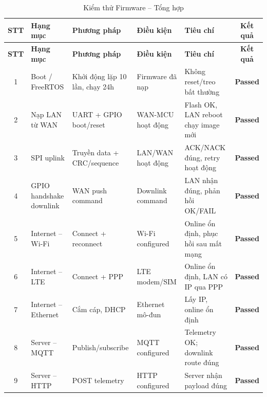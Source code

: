         \begin{longtable}{|c|p{}|p{}|p{}|p{}|c|}
            \caption{Kiểm thử Firmware -- Tổng hợp}
            \label{tab:test_firmware_summary} \\
            \hline
            \textbf{STT} & \textbf{Hạng mục} & \textbf{Phương pháp} & \textbf{Điều kiện} & \textbf{Tiêu chí} & \textbf{Kết quả} \\ \hline
            \endfirsthead
            \hline
            \textbf{STT} & \textbf{Hạng mục} & \textbf{Phương pháp} & \textbf{Điều kiện} & \textbf{Tiêu chí} & \textbf{Kết quả} \\ \hline
            \endhead
            \hline
            \endfoot
            \endlastfoot
        
            1 & Boot / FreeRTOS & Khởi động lặp 10 lần, chạy 24h & Firmware đã nạp & Không reset/treo bất thường & \textcolor{modern_blue}{\textbf{Passed}} \\ \hline
            2 & Nạp LAN từ WAN & UART + GPIO boot/reset & WAN-MCU hoạt động & Flash OK, LAN reboot chạy image mới & \textcolor{modern_blue}{\textbf{Passed}} \\ \hline
            3 & SPI uplink & Truyền data + CRC/sequence & LAN/WAN hoạt động & ACK/NACK đúng, retry hoạt động & \textcolor{modern_blue}{\textbf{Passed}} \\ \hline
            4 & GPIO handshake downlink & WAN push command & Downlink command & LAN nhận đúng, phản hồi OK/FAIL & \textcolor{modern_blue}{\textbf{Passed}} \\ \hline
            5 & Internet -- Wi-Fi & Connect + reconnect & Wi-Fi configured & Online ổn định, phục hồi sau mất mạng & \textcolor{modern_blue}{\textbf{Passed}} \\ \hline
            6 & Internet -- LTE & Connect + PPP & LTE modem/SIM & Online ổn định, LAN có IP qua PPP & \textcolor{modern_blue}{\textbf{Passed}} \\ \hline
            7 & Internet -- Ethernet & Cắm cáp, DHCP & Ethernet mô-đun & Lấy IP, online ổn định & \textcolor{modern_blue}{\textbf{Passed}} \\ \hline
            8 & Server -- MQTT & Publish/subscribe & MQTT configured & Telemetry OK; downlink route đúng & \textcolor{modern_blue}{\textbf{Passed}} \\ \hline
            9 & Server -- HTTP & POST telemetry & HTTP configured & Server nhận payload đúng & \textcolor{modern_blue}{\textbf{Passed}} \\ \hline

\end{longtable}
